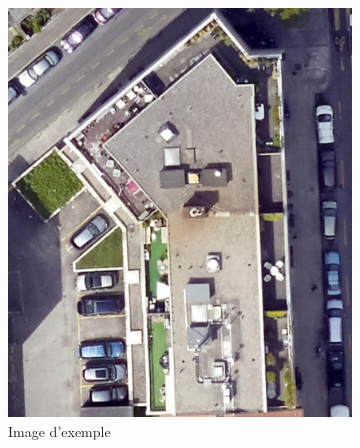 \begin{figure}[H]
    \centering
    
    \begin{subfigure}[b]{0.475\textwidth}
        \centering
        \includegraphics[width=\textwidth]{02-main/figures/ch3/ch3_piste_exploree_classification_07_resultats_image_exemple.png}
        \caption{Image d'exemple}
        \label{fig:ch3_piste_exploree_classification_07_resultats_image_exemple}
    \end{subfigure}
    \hfill
    \begin{subfigure}[b]{0.48\textwidth}
        \centering

\end{subfigure}
\end{figure}
